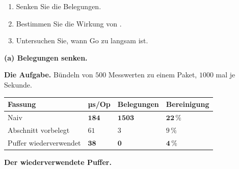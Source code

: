 \begin{aufgabe}
\begin{enumerate}[label=(\alph*)]
\item Senken Sie die Belegungen.
\item Bestimmen Sie die Wirkung von .
\item Untersuchen Sie, wann Go zu langsam ist.
\end{enumerate}

\loesung
\textbf{(a) Belegungen senken.}

\textbf{Die Aufgabe.} Bündeln von $500$ Messwerten zu einem Paket, $1000$ mal je Sekunde.

\begin{center}
{\small
\renewcommand{\arraystretch}{1.45}
\begin{tabular}{@{}P{2.8cm}P{1.8cm}P{2.0cm}P{2.0cm}@{}}
\toprule
\textbf{Fassung} & \textbf{µs/Op} & \textbf{Belegungen} & \textbf{Bereinigung}\\
\midrule
Naiv & $\mathbf{184}$ & $\mathbf{1503}$ & $\mathbf{22\,\%}$\\
Abschnitt vorbelegt & $61$ & $3$ & $9\,\%$\\
Puffer wiederverwendet & $\mathbf{38}$ & $\mathbf{0}$ & \textcolor{gruen}{$\mathbf{4\,\%}$}\\
\bottomrule
\end{tabular}}
\end{center}

\begin{center}
\begin{minipage}{0.88\textwidth}
\end{minipage}
\end{center}

\textbf{Der wiederverwendete Puffer.}

\begin{center}
\begin{minipage}{0.9\textwidth}
\\
\\
\code{\}}\\
\\
\\
\end{minipage}
\end{center}


\end{aufgabe}
